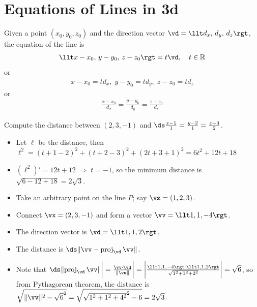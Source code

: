 \section{Equations of Lines in 3d}\label{sec lines 3d}
\begin{impeqn}\label{par eqn of line}
Given a point $(x_0,y_0,z_0)$ and the direction vector $\vd = \llt d_x,\,d_y,\,d_z\rgt$, the equation of the line is
\begin{align*}
\llt x - x_0,\,y - y_0,\,z - z_0\rgt = t\vd,\quad t\in\mathbb{R}
\end{align*}
or %
\begin{align*}
x - x_0 = t d_x,\;y - y_0 = t d_y,\;z - z_0 = t d_z
\end{align*}
or
\begin{align*}
\frac{x - x_0}{d_x} = \frac{y - y_0}{d_y} = \frac{z - z_0}{d_z}
\end{align*}
\end{impeqn}%
{}
\begin{eg}\label{eg:VPdistance-point-line}
Compute the distance between $(2, 3, -1)$ and $\ds\frac{x-1}{1} = \frac{y-2}{1} = \frac{z-3}{2}$.
\soln
\begin{itemize}
\item Let $\ell$ be the distance, then $\ell^2 = (t + 1 - 2)^2 + (t + 2 - 3)^2 + (2 t + 3 + 1)^2 = 6t^2 + 12 t + 18$
\item $(\ell^2)' = 12 t + 12\;\Longrightarrow\;t = -1$, so the minimum distance is $\sqrt{6 - 12 + 18} = 2\sqrt{3}$.
\end{itemize}
\soln
\begin{itemize}
\item Take an arbitrary point on the line $P$; say $\vz = (1, 2, 3)$.
\item Connect $\vx = (2, 3, -1)$ and form a vector $\vv = \llt1, 1, -4\rgt$.
\item The direction vector is $\vd = \llt1, 1, 2\rgt$.
\item The distance is $\ds\|\vv - {\rm proj}_{\vd}\,\vv\|$.
\item Note that $\ds\|{\rm proj}_{\vd}\,\vv\|\bigg| = \frac{\vv\cdot\vd}{\|\vn\|}\bigg| = \bigg|\frac{\llt1,1,-4\rgt\cdot\llt1,1,2\rgt}{\sqrt{1^2+1^2+2^2}}\bigg| = \sqrt{6}$, so from Pythagorean theorem, the distance is $\sqrt{\|\vv\|^2 - \sqrt{6}^2} = \sqrt{\sqrt{1^2+1^2+4^2}^2 - 6} = 2\sqrt{3}$.
\end{itemize}
\end{eg}
